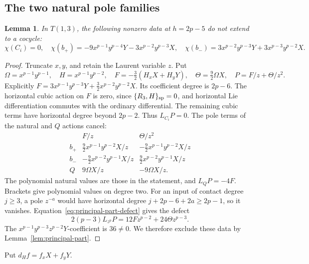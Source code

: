 \documentclass[11pt]{article}
\theoremstyle{plain}
\newtheorem{lemma}[lemma]{Lemma}
\theoremstyle{definition}
\theoremstyle{remark}
\numberwithin{equation}{section}
\begin{document}
\subsection{The two natural pole families}

\begin{lemma}\label{lem:order-two-pole}
In \(T(1,3)\), the following nonzero data at
\(h=2p-5\) do not extend to a cocycle:
\[
 \chi(C_i)=0,\quad
 \chi(b_+)=-9x^{p-1}y^{p-4}Y-3x^{p-2}y^{p-3}X,\quad
 \chi(b_-)=3x^{p-2}y^{p-3}Y+3x^{p-3}y^{p-2}X .
\]
\end{lemma}
\begin{proof}
Truncate \(x,y\), and retain the Laurent variable \(z\).
Put
\[
 \Omega=x^{p-1}y^{p-1},\quad H=x^{p-1}y^{p-2},\quad
 F=-\tfrac32(H_xX+H_yY),\quad\Theta=\tfrac92\Omega X,\quad
 P=F/z+\Theta/z^2 .
\]
Explicitly
\(F=3x^{p-1}y^{p-3}Y+\tfrac32x^{p-2}y^{p-2}X\).
Its coefficient degree is \(2p-6\).
The horizontal cubic action on \(F\) is zero, since
\(\{R_3,H\}_{\rm sp}=0\), and horizontal Lie differentiation
commutes with the ordinary differential.
The remaining cubic terms have horizontal degree beyond \(2p-2\).
Thus \(L_{C_i}P=0\).
The pole terms of the natural and \(Q\) actions cancel:
\[
\begin{array}{c|cc}
 &F/z&\Theta/z^2\\ \hline
 b_+&\frac92x^{p-1}y^{p-2}X/z&
                   -\frac92x^{p-1}y^{p-2}X/z\\
 b_-&-\frac92x^{p-2}y^{p-1}X/z&
                    \frac92x^{p-2}y^{p-1}X/z\\
 Q&9\Omega X/z&-9\Omega X/z .
\end{array}
\]
The polynomial natural values are those in the statement,
and \(L_QP=-4F\).
Brackets give polynomial values on degree two.
For an input of contact degree \(j\ge3\), a pole \(z^{-a}\)
would have horizontal degree
\(j+2p-6+2a\ge2p-1\), so it vanishes.
Equation~\eqref{eq:principal-part-defect} gives the defect
\[
 2(p-3)L_{z^p}P=12Fz^{p-2}+24\Theta z^{p-3}.
\]
The \(x^{p-1}y^{p-3}z^{p-2}Y\)-coefficient is \(36\ne0\).
We therefore exclude these data by Lemma~\ref{lem:principal-part}.
\end{proof}

Put \(d_Hf=f_xX+f_yY\).
\end{document}
